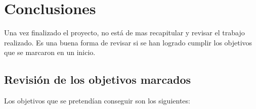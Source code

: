 
\chapter{Conclusiones}
\label{conclusiones}
Una vez finalizado el proyecto, no está de mas recapitular y revisar el trabajo realizado. Es una buena forma de revisar si se han logrado cumplir los objetivos que se marcaron en un inicio.
\section{Revisión de los objetivos marcados}
Los objetivos que se pretendían conseguir son los siguientes:
